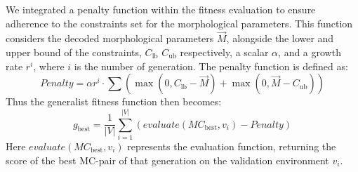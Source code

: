     We integrated a penalty function within the fitness evaluation to ensure adherence to the constraints set for the morphological parameters. This function considers the decoded morphological parameters $\overrightarrow{M}$, alongside the lower and upper bound of the constraints, $C_\text{lb}$ $C_\text{ub}$ respectively, a scalar $\alpha$, and a growth rate $r^i$, where $i$ is the number of generation. The penalty function is defined as:
    \begin{equation}
        Penalty = \alpha r^i \cdot \sum(
            \max(0, C_\text{lb} - \overrightarrow{M}) + 
            \max(0, \overrightarrow{M} - C_\text{ub})
        )
    \end{equation}
    Thus the generalist fitness function then becomes:
    \begin{equation}
        g_{\text{best}} = \frac{1}{|V|} \sum_{i=1}^{|V|}(
            evaluate(MC_{\text{best}}, v_i) - Penalty
        ) 
    \end{equation}
    Here $evaluate(MC_{\text{best}}, v_i)$ represents the evaluation function, returning the score of the best MC-pair of that generation on the validation environment $v_i$.